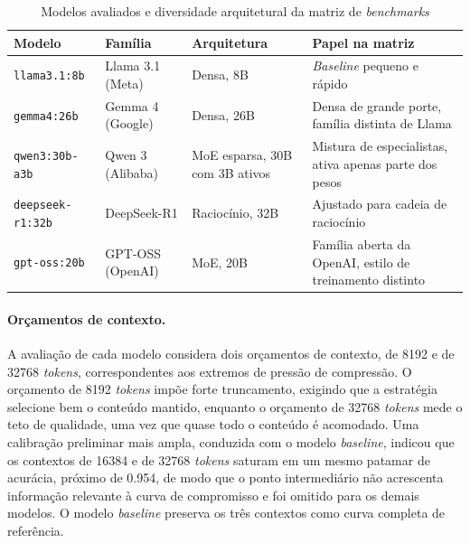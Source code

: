 \begin{table}[htbp]
\centering
\caption{Modelos avaliados e diversidade arquitetural da matriz de \textit{benchmarks}}
\label{tab:modelos}
\small
\setlength{\tabcolsep}{5pt}
\begin{tabular}{p{3.3cm}p{2.6cm}p{2.6cm}p{3.9cm}}
\toprule
\textbf{Modelo} & \textbf{Família} & \textbf{Arquitetura} & \textbf{Papel na matriz} \\
\midrule
\texttt{llama3.1:8b} & Llama 3.1 (Meta) & Densa, 8B & \textit{Baseline} pequeno e rápido \\
\addlinespace
\texttt{gemma4:26b} & Gemma 4 (Google) & Densa, 26B & Densa de grande porte, família distinta de Llama \\
\addlinespace
\texttt{qwen3:30b-a3b} & Qwen 3 (Alibaba) & MoE esparsa, 30B com 3B ativos & Mistura de especialistas, ativa apenas parte dos pesos \\
\addlinespace
\texttt{deepseek-r1:32b} & DeepSeek-R1 & Raciocínio, 32B & Ajustado para cadeia de raciocínio \\
\addlinespace
\texttt{gpt-oss:20b} & GPT-OSS (OpenAI) & MoE, 20B & Família aberta da OpenAI, estilo de treinamento distinto \\
\bottomrule
\end{tabular}
\end{table}

\paragraph{Orçamentos de contexto.}
A avaliação de cada modelo considera dois orçamentos de contexto, de 8192 e de 32768 \textit{tokens}, correspondentes aos extremos de pressão de compressão. O orçamento de 8192 \textit{tokens} impõe forte truncamento, exigindo que a estratégia selecione bem o conteúdo mantido, enquanto o orçamento de 32768 \textit{tokens} mede o teto de qualidade, uma vez que quase todo o conteúdo é acomodado. Uma calibração preliminar mais ampla, conduzida com o modelo \textit{baseline}, indicou que os contextos de 16384 e de 32768 \textit{tokens} saturam em um mesmo patamar de acurácia, próximo de 0.954, de modo que o ponto intermediário não acrescenta informação relevante à curva de compromisso e foi omitido para os demais modelos. O modelo \textit{baseline} preserva os três contextos como curva completa de referência.

